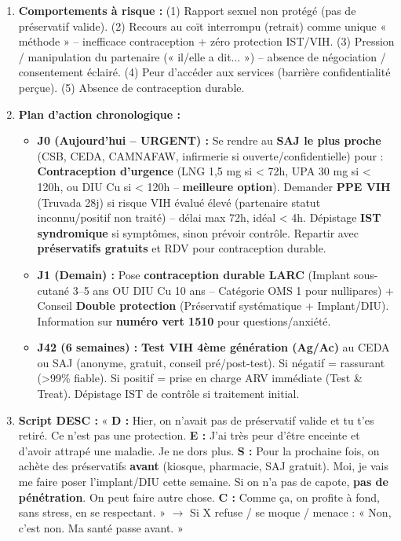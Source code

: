 \documentclass[11pt]{article}
\begin{document}
\begin{corrige}
\begin{enumerate}
    \item \textbf{Comportements à risque :} (1) Rapport sexuel non protégé (pas de préservatif valide). (2) Recours au coït interrompu (retrait) comme unique « méthode » -- inefficace contraception + zéro protection IST/VIH. (3) Pression / manipulation du partenaire (« il/elle a dit... ») -- absence de négociation / consentement éclairé. (4) Peur d'accéder aux services (barrière confidentialité perçue). (5) Absence de contraception durable.
    \item \textbf{Plan d'action chronologique :}
    \begin{itemize}
        \item \textbf{J0 (Aujourd'hui -- URGENT) :} Se rendre au \textbf{SAJ le plus proche} (CSB, CEDA, CAMNAFAW, infirmerie si ouverte/confidentielle) pour : \textbf{Contraception d'urgence} (LNG 1,5 mg si < 72h, UPA 30 mg si < 120h, ou DIU Cu si < 120h -- \textbf{meilleure option}). Demander \textbf{PPE VIH} (Truvada 28j) si risque VIH évalué élevé (partenaire statut inconnu/positif non traité) -- délai max 72h, idéal < 4h. Dépistage \textbf{IST syndromique} si symptômes, sinon prévoir contrôle. Repartir avec \textbf{préservatifs gratuits} et RDV pour contraception durable.
        \item \textbf{J1 (Demain) :} Pose \textbf{contraception durable LARC} (Implant sous-cutané 3--5 ans OU DIU Cu 10 ans -- Catégorie OMS 1 pour nullipares) + Conseil \textbf{Double protection} (Préservatif systématique + Implant/DIU). Information sur \textbf{numéro vert 1510} pour questions/anxiété.
        \item \textbf{J42 (6 semaines) :} \textbf{Test VIH 4ème génération (Ag/Ac)} au CEDA ou SAJ (anonyme, gratuit, conseil pré/post-test). Si négatif = rassurant (>99\% fiable). Si positif = prise en charge ARV immédiate (Test \& Treat). Dépistage IST de contrôle si traitement initial.
    \end{itemize}
    \item \textbf{Script DESC :} « \textbf{D :} Hier, on n'avait pas de préservatif valide et tu t'es retiré. Ce n'est pas une protection. \textbf{E :} J'ai très peur d'être enceinte et d'avoir attrapé une maladie. Je ne dors plus. \textbf{S :} Pour la prochaine fois, on achète des préservatifs \textbf{avant} (kiosque, pharmacie, SAJ gratuit). Moi, je vais me faire poser l'implant/DIU cette semaine. Si on n'a pas de capote, \textbf{pas de pénétration}. On peut faire autre chose. \textbf{C :} Comme ça, on profite à fond, sans stress, en se respectant. » $\rightarrow$ Si X refuse / se moque / menace : « Non, c'est non. Ma santé passe avant. »

\end{enumerate}
\end{corrige}
\end{document}
